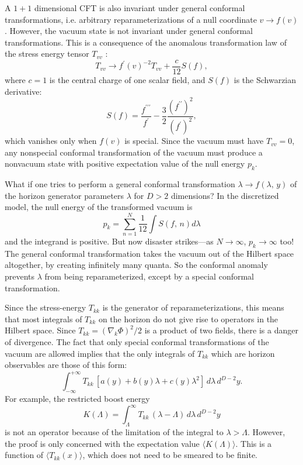 \documentclass{article}
\begin{document}
A $1+1$ dimensional CFT is also invariant under general conformal transformations, i.e. arbitrary reparameterizations of a null coordinate $v \to f(v)$.  However, the vacuum state is not invariant under general conformal transformations.  This is a consequence of the anomalous transformation law of the stress energy tensor $T_{vv}$ \cite{ginsparg89}:
\begin{equation}
T_{vv} \to f^\prime(v)^{-2} T_{vv} + \frac{c}{12} S(f),
\end{equation}
where $c = 1$ is the central charge of one scalar field, and $S(f)$ is the Schwarzian derivative:
\begin{equation}
S(f) =
\frac{f^{\prime\prime\prime}}{f^\prime} -
\frac{3}{2}\frac{(f^{\prime\prime})^2}{(f^\prime)^2},
\end{equation}
which vanishes only when $f(v)$ is special.  Since the vacuum must have $T_{vv} = 0$, any nonspecial conformal transformation of the vacuum must produce a nonvacuum state with positive expectation value of the null energy $p_k$.

What if one tries to perform a general conformal transformation $\lambda \to f(\lambda,\,y)$ of the horizon generator parameters $\lambda$ for $D > 2$ dimensions?  In the discretized model, the null energy of the transformed vacuum is
\begin{equation}
p_k = \sum_{n = 1}^N \frac{1}{12} \int S(f,\,n) d\lambda
\end{equation}
and the integrand is positive.  But now disaster strikes---as $N \to \infty$, $p_k \to \infty$ too!  The general conformal transformation takes the vacuum out of the Hilbert space altogether, by creating infinitely many quanta.  So the conformal anomaly prevents $\lambda$ from being reparameterized, except by a special conformal transformation.

Since the stress-energy $T_{kk}$ is the generator of reparameterizations, this means that most integrals of $T_{kk}$ on the horizon do not give rise to operators in the Hilbert space.  Since $T_{kk} = (\nabla_k \Phi)^2/2$ is a product of two fields, there is a danger of divergence.  The fact that only special conformal transformations of the vacuum are allowed implies that the only integrals of $T_{kk}$ which are horizon observables are those of this form:
\begin{equation}
\int^{+\infty}_{-\infty} T_{kk}\,[a(y) + b(y)\lambda + c(y)\lambda^2]\,d\lambda\,d^{D-2}y.
\end{equation}
For example, the restricted boost energy
\begin{equation}
K(\Lambda) = \int_\Lambda^\infty T_{kk}\,(\lambda - \Lambda) \,d\lambda\,d^{D-2}y
\end{equation}
is not an operator because of the limitation of the integral to $\lambda > \Lambda$.  However,
the proof is only concerned with the expectation value $\langle K(\Lambda) \rangle$.  This is a function of $\langle T_{kk}(x) \rangle$, which does not need to be smeared to be finite.
\end{document}
